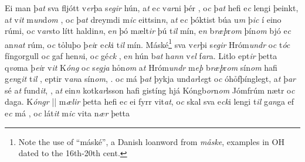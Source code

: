 Ei man þ\textit{at} sva fljótt v\textit{er}þa s\textit{egir} hún, a\textit{t} e\textit{c} v\textit{ar}ni þér  , o\textit{c} þ\textit{at} hefi e\textit{c} lengi þeinkt, a\textit{t} v\textit{it} m\textit{un}d\textit{om} , 
o\textit{c} þ\textit{at} dreymdi m\textit{ic} eittsin\textit{n}, a\textit{t} e\textit{c} þóktist búa u\textit{m} þ\textit{ic} í eino rúmi, o\textit{c} v\textit{ar}sto lítt haldin\textit{n}, e\textit{n} þó mælt\textit{ir} þú t\textit{il} mín, e\textit{n} b\textit{ræþ}r\textit{om} þín\textit{om} bjó e\textit{c} an\textit{n}\textit{at} rúm, o\textit{c} tỏluþo þ\textit{ei}r e\textit{ck}i   t\textit{il} mín.  
Máské\footnote{Note the use of \enquote{máské}, a Danish loanword from \textit{måske}, examples in OH dated to the 16th-20th cent.} sva v\textit{er}þi s\textit{egir} Hróm\textit{undr} o\textit{c} t\textit{óc} fíngorgull o\textit{c} gaf hen\textit{n}i, o\textit{c} gé\textit{ck} , e\textit{n} hún b\textit{at} h\textit{ann} v\textit{el} f\textit{ar}a.
Litlo ept\textit{ir} þetta q\textit{vo}ma þ\textit{ei}r    v\textit{it} K\textit{óng} o\textit{c} s\textit{egja} hỏn\textit{om} a\textit{t} Hróm\textit{undr} m\textit{eþ} b\textit{ræþ}r\textit{om} sín\textit{om} hafi g\textit{en}g\textit{it} t\textit{il} , eptir  v\textit{an}a sín\textit{om},  . o\textit{c} má þ\textit{at} þykja und\textit{ar}l\textit{e}gt
o\textit{c} óhỏfþínglegt, a\textit{t} þ\textit{ar} sé   a\textit{t} fund\textit{it},  , a\textit{t} ein\textit{n} kotk\textit{ar}lsson hafi  gistíng hjá Kóngb\textit{or}n\textit{om} Jómfrúm   nætr o\textit{c} daga. K\textit{óngr} 
||
m\textit{ælir} þetta hefi e\textit{c} ei fyrr vit\textit{at},
o\textit{c} skal sva e\textit{ck}i lengi t\textit{il} g\textit{an}ga  ef e\textit{c} má    , o\textit{c} lát\textit{it} m\textit{ic} vita n\textit{ær} þetta
